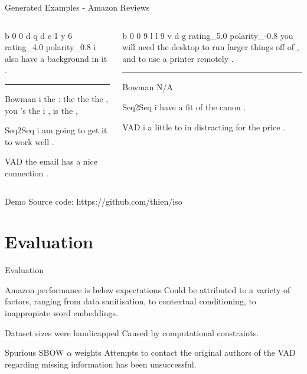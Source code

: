 \documentclass[aspectratio=169, 11pt]{beamer}
\begin{document}
\begin{frame}{Generated Examples - Amazon Reviews}
  \begin{columns}
    \begin{column}{0.5\textwidth}
      b 0 0 d q d c 1 y 6 rating\_4.0 polarity\_0.8 i also have a background in it .   
      \noindent\rule{\textwidth}{0.4pt}
      \begin{block}{Bowman}
        i the : the the the , you 's the i , is the ,             
      \end{block}
      \begin{block}{Seq2Seq}
        i am going to get it to work well .    
      \end{block}
      \begin{block}{VAD}
        the email has a nice connection .    
      \end{block}
    \end{column}
    \begin{column}{0.5\textwidth}
        b 0 0 9 l l 9 v d g rating\_5.0 polarity\_-0.8 you will need the desktop to run larger things off of , and to use a printer remotely .
      \noindent\rule{\textwidth}{0.4pt}
      \begin{block}{Bowman}
        N/A
      \end{block}
      \begin{block}{Seq2Seq}
        i have a fit of the canon . 
      \end{block}
      \begin{block}{VAD}
        i a little to in distracting for the price .
      \end{block}
    \end{column}
  \end{columns}
\end{frame}

\begin{frame}
  \begin{block}{Demo}
    Source code: https://github.com/thien/iso
  \end{block}
\end{frame}

\section{Evaluation}
\begin{frame}{Evaluation}
  \begin{block}{Amazon performance is below expectations}
    Could be attributed to a variety of factors, ranging from data sanitisation, to contextual conditioning, to inappropiate word embeddings.
  \end{block}
  \begin{block}{Dataset sizes were handicapped}
    Caused by computational constraints.
  \end{block}
  \begin{block}{Spurious SBOW $\alpha$ weights}
    Attempts to contact the original authors of the VAD regarding missing information has been unsuccessful.
  \end{block}
\end{frame}
\end{document}
